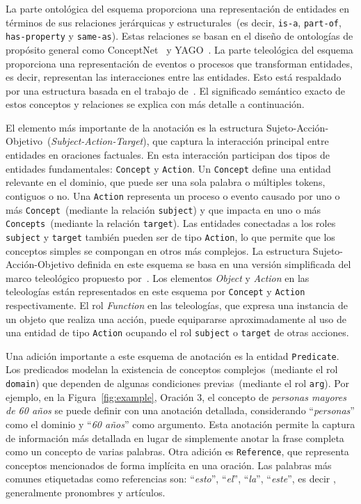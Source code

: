 La parte ontológica del esquema proporciona una representación de entidades en términos de sus relaciones jerárquicas y estructurales~(es decir, \texttt{is-a}, \texttt{part-of}, \texttt{has-property} y \texttt{same-as}).
Estas relaciones se basan en el diseño de ontologías de propósito general como ConceptNet~\cite{speer2017conceptnet} y YAGO~\cite{suchanek2007yago}.
La parte teleológica del esquema proporciona una representación de eventos o procesos que transforman entidades, es decir, representan las interacciones entre las entidades.
Esto está respaldado por una estructura basada en el trabajo de~\citet{teleologies}.
El significado semántico exacto de estos conceptos y relaciones se explica con más detalle a continuación.

El elemento más importante de la anotación es la estructura Sujeto-Acción-Objetivo~(\textit{Subject-Action-Target}), que captura la interacción principal entre entidades en oraciones factuales.
En esta interacción participan dos tipos de entidades fundamentales: \texttt{Concept} y \texttt{Action}.
Un \texttt{Concept} define una entidad relevante en el dominio, que puede ser una sola palabra o múltiples tokens, contiguos o no.
Una \texttt{Action} representa un proceso o evento causado por uno o más \texttt{Concept}~(mediante la relación \texttt{subject}) y que impacta en uno o más \texttt{Concepts}~(mediante la relación \texttt{target}).
Las entidades conectadas a los roles \texttt{subject} y \texttt{target} también pueden ser de tipo \texttt{Action}, lo que permite que los conceptos simples se compongan en otros más complejos.
La estructura Sujeto-Acción-Objetivo definida en este esquema se basa en una versión simplificada del marco teleológico propuesto por~\citet{teleologies}. Los elementos \textit{Object} y \textit{Action} en las teleologías están representados en este esquema por \texttt{Concept} y \texttt {Action} respectivamente.
El rol \textit{Function} en las teleologías, que expresa una instancia de un objeto que realiza una acción, puede equipararse aproximadamente al uso de una entidad de tipo \texttt{Action} ocupando el rol \texttt{subject} o \texttt{target} de otras acciones.

Una adición importante a este esquema de anotación es la entidad \texttt{Predicate}.
Los predicados modelan la existencia de conceptos complejos~(mediante el rol \texttt{domain}) que dependen de algunas condiciones previas~(mediante el rol \texttt{arg}).
Por ejemplo, en la Figura~\ref{fig:example}, Oración 3, el concepto de \textit{personas mayores de 60 años} se puede definir con una anotación detallada, considerando ``\textit{personas}'' como el dominio y ``\textit{60 años}'' como argumento. Esta anotación permite la captura de información más detallada en lugar de simplemente anotar la frase completa como un concepto de varias palabras.
Otra adición es \texttt{Reference}, que representa conceptos mencionados de forma implícita en una oración.
Las palabras más comunes etiquetadas como referencias son: ``\textit{esto}'', ``\textit{el}'', ``\textit{la}'', ``\textit{este}'', es decir , generalmente pronombres y artículos.

